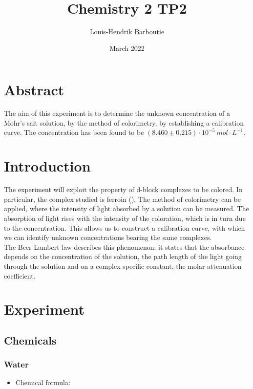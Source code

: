 \documentclass[twocolumn]{article}
\title{Chemistry 2 TP2}
\author{Louis-Hendrik Barboutie}
\date{March 2022}
\begin{document}
\maketitle

\clearpage

\onecolumn

\tableofcontents

\clearpage

\twocolumn

\section{Abstract}
The aim of this experiment is to determine the unknown concentration of a Mohr's salt solution, by the method of colorimetry, by establishing a calibration curve. The concentration has been found to be $(8.460 \pm 0.215) \cdot 10^{-5} \ mol \cdot L^{-1}$. 
\section{Introduction}
The experiment will exploit the property of d-block complexes to be colored. In particular, the complex studied is ferroin (). The method of colorimetry can be applied, where the intensity of light absorbed by a solution can be measured. The absorption of light rises with the intensity of the coloration, which is in turn due to the concentration. This allows us to construct a calibration curve, with which we can identify unknown concentrations bearing the same complexes. \\ The Beer-Lambert law describes this phenomenon: it states that the absorbance depends on the concentration of the solution, the path length of the light going through the solution and on a complex specific constant, the molar attenuation coefficient. 
\section{Experiment}
\subsection{Chemicals}
\subsubsection{Water}
\begin{itemize}
    \item Chemical formula: 
\end{itemize}
\end{document}
